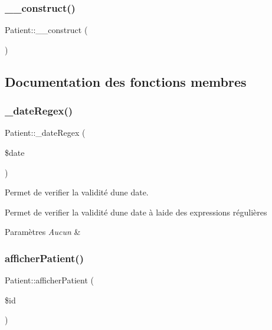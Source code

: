 \subsubsection{\texorpdfstring{\+\_\+\+\_\+construct()}{\_\_construct()}}
{\footnotesize\ttfamily Patient\+::\+\_\+\+\_\+construct (\begin{DoxyParamCaption}{ }\end{DoxyParamCaption})}



\subsection{Documentation des fonctions membres}
\mbox{\label{class_patient_ae3f3a76e0ee807571427204dc0150256}} 
\subsubsection{\texorpdfstring{\+\_\+date\+Regex()}{\_dateRegex()}}
{\footnotesize\ttfamily Patient\+::\+\_\+date\+Regex (\begin{DoxyParamCaption}\item[{}]{\$date }\end{DoxyParamCaption})}



Permet de verifier la validité d\textquotesingle{}une date. 

Permet de verifier la validité d\textquotesingle{}une date à l\textquotesingle{}aide des expressions régulières 
\begin{DoxyParams}{Paramètres}
{\em Aucun} & \\
\hline
\end{DoxyParams}
\mbox{\label{class_patient_a4ece101cffc7c5cff730959ee9c9b684}} 
\subsubsection{\texorpdfstring{afficher\+Patient()}{afficherPatient()}}
{\footnotesize\ttfamily Patient\+::afficher\+Patient (\begin{DoxyParamCaption}\item[{}]{\$id }\end{DoxyParamCaption})}




